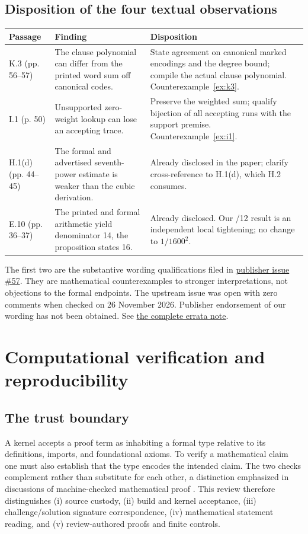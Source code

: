 \documentclass[11pt,letterpaper]{article}
\theoremstyle{definition}\newtheorem{definition}[theorem]{Definition}\newtheorem{example}[theorem]{Example}
\theoremstyle{remark}\newtheorem{remark}[theorem]{Remark}
\newcommand{\aud}[2]{\href{https://github.com/nousentllc/VP-VNP-Review/blob/567303d0bcf4f9d54390437b137752446e58ccd6/#1}{#2}}
\begin{document}
\subsection{Disposition of the four textual observations}
\begin{longtable}{@{}p{.13\linewidth}p{.40\linewidth}p{.39\linewidth}@{}}
\toprule
Passage & Finding & Disposition \\\midrule\endhead
K.3 (pp. 56--57) & The clause polynomial can differ from the printed word sum off canonical codes. & State agreement on canonical marked encodings and the degree bound; compile the actual clause polynomial. Counterexample~\ref{ex:k3}.\\[3pt]
I.1 (p. 50) & Unsupported zero-weight lookup can lose an accepting trace. & Preserve the weighted sum; qualify bijection of all accepting runs with the support premise. Counterexample~\ref{ex:i1}.\\[3pt]
H.1(d) (pp. 44--45) & The formal and advertised seventh-power estimate is weaker than the cubic derivation. & Already disclosed in the paper; clarify cross-reference to H.1(d), which H.2 consumes.\\[3pt]
E.10 (pp. 36--37) & The printed and formal arithmetic yield denominator 14, the proposition states 16. & Already disclosed. Our /12 result is an independent local tightening; no change to $1/1600^2$.\\
\bottomrule
\end{longtable}
The first two are the substantive wording qualifications filed in \href{https://github.com/anthropics/formal-math/issues/57}{publisher issue \#57}. They are mathematical counterexamples to stronger interpretations, not objections to the formal endpoints. The upstream issue was open with zero comments when checked on 26 November 2026. Publisher endorsement of our wording has not been obtained. See \aud{passes/publisher-errata.md}{the complete errata note}.

\section{Computational verification and reproducibility}\label{sec:formal}
\subsection{The trust boundary}
A kernel accepts a proof term as inhabiting a formal type relative to its definitions, imports, and foundational axioms. To verify a mathematical claim one must also establish that the type encodes the intended claim. The two checks complement rather than substitute for each other, a distinction emphasized in discussions of machine-checked mathematical proof \cite{pollack}. This review therefore distinguishes (i) source custody, (ii) build and kernel acceptance, (iii) challenge/solution signature correspondence, (iv) mathematical statement reading, and (v) review-authored proofs and finite controls.
\end{document}
